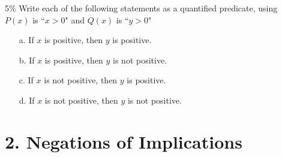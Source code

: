 \documentclass[a4paper,12pt]{book}
\newcounter{question}
\begin{document}
        \hrulefill

        \begin{question}{\thequestion}{5\%}
            Write each of the following statements as a
            quantified predicate, using \\
            $P(x)$ is ``$x > 0$" and
            $Q(x)$ is ``$y > 0$"

            \begin{enumerate}
                \item[a.] If $x$ is positive, then $y$ is positive. 
                \item[b.] If $x$ is positive, then $y$ is not positive. 
                \item[c.] If $x$ is not positive, then $y$ is positive. 
                \item[d.] If $x$ is not positive, then $y$ is not positive.
            \end{enumerate}
        \end{question}


    \newpage

    \section*{2. Negations of Implications}
\end{document}
